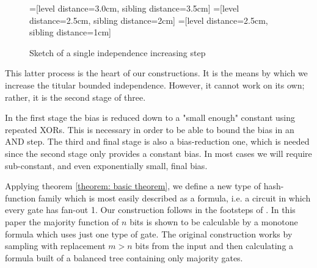 \documentclass[12pt]{article}
\begin{document}
	\begin{figure}[H]
		\centering
		=[level distance=3.0cm, sibling distance=3.5cm]
		=[level distance=2.5cm, sibling distance=2cm]
		=[level distance=2.5cm, sibling distance=1cm]
		\caption{Sketch of a single independence increasing step} \label{figure: single independence step}
	\end{figure}
	
	This latter process is the heart of our constructions.
	It is the means by which we increase the titular bounded independence.
	However, it cannot work on its own; rather, it is the second stage of three.
	
	In the first stage the bias is reduced down to a "small enough" constant using repeated XORs.
	This is necessary in order to be able to bound the bias in an AND step.
	The third and final stage is also a bias-reduction one, which is needed since the second stage only provides a constant bias.
	In most cases we will require sub-constant, and even exponentially small, final bias.
	
	Applying theorem \ref{theorem: basic theorem}, we define a new type of hash-function family which is most easily described as a formula, i.e. a circuit in which every gate has fan-out 1.
	Our construction follows in the footsteps of \cite{Valiant}.
	In this paper the majority function of $n$ bits is shown to be calculable by a monotone formula which uses just one type of gate.
	The original construction works by sampling with replacement $m>n$ bits from the input and then calculating a formula built of a balanced tree containing only majority gates.
	
\end{document}
